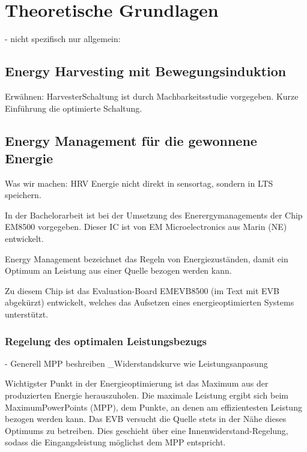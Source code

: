 \chapter{Theoretische Grundlagen}
- nicht spezifisch
nur allgemein:

\section{Energy Harvesting mit Bewegungsinduktion}
Erwähnen: HarvesterSchaltung ist durch Machbarkeitsstudie vorgegeben.
Kurze Einführung die optimierte Schaltung.





\section{Energy Management für die gewonnene Energie}
Was wir machen: HRV Energie nicht direkt in sensortag, sondern in LTS speichern.

In der Bachelorarbeit ist bei der Umsetzung des Enerergymanagements der Chip EM8500 vorgegeben. Dieser IC ist von EM Microelectronics aus Marin (NE) entwickelt. %


Energy Management bezeichnet das Regeln von Energiezuständen, damit ein Optimum an Leistung aus einer Quelle bezogen werden kann.



Zu diesem Chip ist das Evaluation-Board EMEVB8500 (im Text mit EVB abgekürzt) entwickelt, welches das Aufsetzen eines energieoptimierten Systems unterstützt. 


\subsection{Regelung des optimalen Leistungsbezugs}
- Generell MPP beshreiben
_Widerstandskurve
wie Leistungsanpasung

Wichtigster Punkt in der Energieoptimierung ist das Maximum aus der produzierten Energie herauszuholen. Die maximale Leistung ergibt sich beim MaximumPowerPoints (MPP), dem Punkte, an denen am effizientesten Leistung bezogen werden kann. 
Das EVB versucht die Quelle stets in der Nähe dieses Optimums zu betreiben. Dies geschieht über eine Innenwiderstand-Regelung, sodass die Eingangsleistung möglichst dem MPP entspricht.

